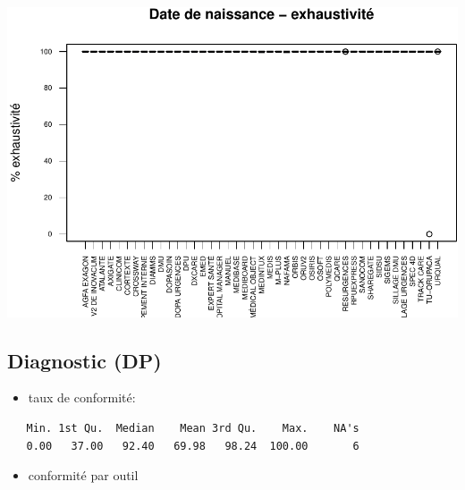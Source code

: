\documentclass[]{article}
\begin{document}
\includegraphics{septembre2015_files/figure-latex/unnamed-chunk-17-1.pdf}

\subsection{Diagnostic (DP)}\label{diagnostic-dp}

\begin{itemize}
\itemsep1pt\parskip0pt
\item
  taux de conformité:
\end{itemize}

\begin{verbatim}
   Min. 1st Qu.  Median    Mean 3rd Qu.    Max.    NA's 
   0.00   37.00   92.40   69.98   98.24  100.00       6 
\end{verbatim}

\begin{itemize}
\itemsep1pt\parskip0pt
\item
  conformité par outil
\end{itemize}
\end{document}
